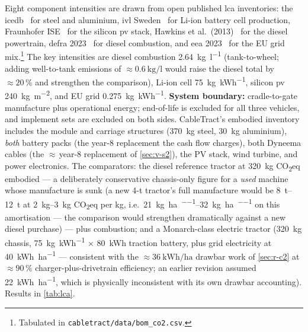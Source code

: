 \documentclass[11pt,a4paper]{article}
\begin{document}
Eight component intensities are drawn from open published \gls{lca} inventories: the \gls{icedb}~\cite{hammond2019ice} for steel and aluminium, \gls{ivl} Sweden~\cite{emilsson2019battery} for Li-ion battery cell production, Fraunhofer ISE~\cite{fraunhoferise2022pv} for the silicon \gls{pv} stack, Hawkins et al.\ (2013)~\cite{hawkins2013ev} for the diesel powertrain, \gls{defra} 2023~\cite{defra2023factors} for diesel combustion, and \gls{eea} 2023~\cite{eea2023electricity} for the EU grid mix.\footnote{Tabulated in \texttt{cabletract/data/bom\_co2.csv}.} The key intensities are diesel combustion \SI{2.64}{\kilogram\per\litre} (tank-to-wheel; adding well-to-tank emissions of ${\approx}\SI{0.6}{\kilogram\per\litre}$ would raise the diesel total by ${\approx}20\,\%$ and strengthen the comparison), Li-ion cell \SI{75}{\kilogram\per\kWh}, silicon \gls{pv} \SI{240}{\kilogram\per\meter\squared}, and EU grid \SI{0.275}{\kilogram\per\kWh}. \textbf{System boundary:} cradle-to-gate manufacture plus operational energy; end-of-life is excluded for all three vehicles, and implement sets are excluded on both sides. CableTract's embodied inventory includes the module and carriage structures (\SI{370}{\kilogram} steel, \SI{30}{\kilogram} aluminium), \emph{both} battery packs (the year-8 replacement the cash flow charges), both Dyneema cables (the ${\approx}$\,year-8 replacement of \cref{sec:v-s2}), the PV stack, wind turbine, and power electronics. The comparators: the diesel reference tractor at \SI{320}{\kilogram} CO\textsubscript{2}eq embodied --- a deliberately conservative chassis-only figure for a \emph{used} machine whose manufacture is sunk (a new 4-t tractor's full manufacture would be \SIrange{8}{12}{\tonne} at \SIrange{2}{3}{\kilogram} CO\textsubscript{2}eq per kg, i.e.\ \SIrange{21}{32}{\kilogram\per\hectare\per\year} on this amortisation --- the comparison would strengthen dramatically against a new diesel purchase) --- plus combustion; and a Monarch-class electric tractor (\SI{320}{\kilogram} chassis, \SI{75}{\kilogram\per\kWh} $\times$ \SI{80}{\kWh} traction battery, plus grid electricity at \SI{40}{\kWh\per\hectare} --- consistent with the ${\approx}\SI{36}{\kWh\per\hectare}$ drawbar work of \cref{sec:r-c2} at ${\approx}90\,\%$ charger-plus-drivetrain efficiency; an earlier revision assumed \SI{22}{\kWh\per\hectare}, which is physically inconsistent with its own drawbar accounting). Results in \cref{tab:lca}.
\end{document}
